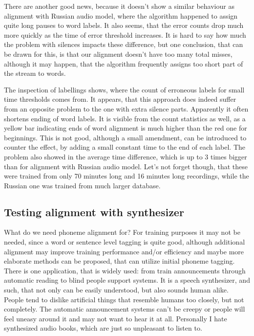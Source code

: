 \documentclass[12pt,a4paper,english]{article}
\begin{document}
There are another good news, because it doesn't show a similar behaviour as alignment with Russian audio model, where the algorithm happened to assign quite long pauses to word labels.
It also seems, that the error counts drop much more quickly as the time of error threshold increases. It is hard to say how much the problem with silences impacts these difference, but one conclusion, that can be drawn for this, is that our alignment doesn't have too many total misses, although it may happen, that the algorithm frequently assigns too short part of the stream to words. \newline

The inspection of labellings shows, where the count of erroneous labels for small time thresholds comes from. It appears, that this approach does indeed suffer from an opposite problem to the one with extra silence parts. Apparently it often shortens ending of word labels. It is visible from the count statistics as well, as a yellow bar indicating ends of word alignment is much higher than the red one for beginnings.
This is not good, although a small amendment, can be introduced to counter the effect, by adding a small constant time to the end of each label. \newline
The problem also showed in the average time difference, which is up to 3 times bigger than for alignment with Russian audio model. Let's not forget though, that these were trained from only 70 minutes long and 16 minutes long recordings, while the Russian one was trained from much larger database.

\newpage
\begin{center}
    \section{Testing alignment with synthesizer}
\end {center}
\setcounter{equation}{0}

What do we need phoneme alignment for? For training purposes it may not be needed, since a word or sentence level tagging is quite good, although additional alignment may improve training performance and/or efficiency and maybe more elaborate methods can be proposed, that can utilize initial phoneme tagging. \newline
There is one application, that is widely used: from train announcements through automatic reading to  blind people support systems. It is a speech synthesizer, and such, that not only can be easily understood, but also sounds human alike. People tend to dislike artificial things that resemble humans too closely, but not completely. The automatic announcement systems can't be creepy or people will feel uneasy around it and may not want to hear it at all. Personally I hate synthesized audio books, which are just so unpleasant to listen to. \newline
\end{document}
